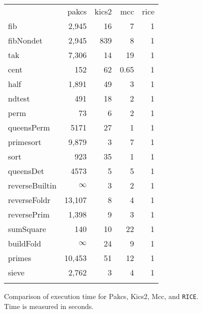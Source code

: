 \documentclass{book}
\newcommand{\rice}{\texttt{RICE}}
\theoremstyle{definition}
\begin{document}
\begin{figure}
\begin{tabular}{||l||r|r|r|r||}
\hhline{||=||=|=|=|=||}
                &  pakcs   & kics2 & mcc   & rice \\
\hhline{||=||=|=|=|=||}
fib             &    2,945 &    16 &     7 &    1 \\
\hline
fibNondet       &    2,945 &   839 &     8 &    1 \\
\hline
tak             &    7,306 &    14 &    19 &    1 \\
\hhline{||=||=|=|=|=||}
cent            &      152 &    62 &  0.65 &    1 \\
\hline
half            &    1,891 &    49 &     3 &    1 \\
\hline
ndtest          &      491 &    18 &     2 &    1 \\
\hline
perm            &       73 &     6 &     2 &    1 \\
\hline
queensPerm      &     5171 &    27 &     1 &    1 \\
\hline
primesort       &    9,879 &     3 &     7 &    1 \\
\hline
sort            &      923 &    35 &     1 &    1 \\
\hhline{||=||=|=|=|=||}
queensDet       &     4573 &     5 &     5 &    1 \\
\hline
reverseBuiltin  & $\infty$ &     3 &     2 &    1 \\
\hline
reverseFoldr    &   13,107 &     8 &     4 &    1 \\
\hline
reversePrim     &    1,398 &     9 &     3 &    1 \\
\hline
sumSquare       &      140 &    10 &    22 &    1 \\
\hline
buildFold       & $\infty$ &    24 &     9 &    1 \\
\hline
primes          &   10,453 &    51 &    12 &    1 \\
\hline
sieve           &    2,762 &     3 &     4 &    1 \\
\hhline{||=||=|=|=|=||}
\end{tabular}

\caption{Comparison of execution time for Pakcs, Kics2, Mcc, and \rice.\\
         Time is measured in seconds.}
\label{fig:time}
\end{figure}
\end{document}
